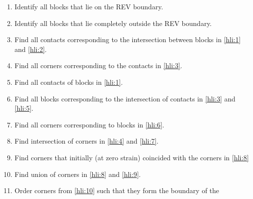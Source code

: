 \begin{enumerate}
	\item \label{hli:1} Identify all blocks that lie on the REV boundary.
	\item \label{hli:2} Identify all blocks that lie completely outside the REV boundary.
	\item \label{hli:3} Find all contacts corresponding to the intersection between blocks in \ref{hli:1} and \ref{hli:2}.
	\item \label{hli:4} Find all corners corresponding to the contacts in \ref{hli:3}.
	\item \label{hli:5} Find all contacts of blocks in \ref{hli:1}.
	\item \label{hli:6} Find all blocks corresponding to the intersection of contacts in \ref{hli:3} and \ref{hli:5}.
	\item \label{hli:7} Find all corners corresponding to blocks in \ref{hli:6}.
	\item \label{hli:8} Find intersection of corners in \ref{hli:4} and \ref{hli:7}.
	\item \label{hli:9}	Find corners that initially (at zero strain) coincided with the corners in \ref{hli:8}
	\item \label{hli:10} Find union of corners in \ref{hli:8} and \ref{hli:9}.
	\item \label{hli:11} Order corners from \ref{hli:10} such that they form the boundary of the 
\end{enumerate}

